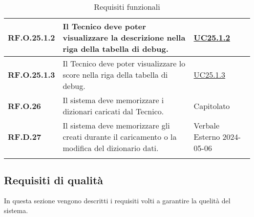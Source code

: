 \begin{longtable}{|P{3cm}|P{6,5cm}|>{\arraybackslash}P{4cm}|}
    \textbf{RF.O.25.1.2} & Il Tecnico deve poter visualizzare la descrizione nella riga della tabella di debug. &  \hyperref[UC25poin1point2]{UC25.1.2}\\
    \hline
    \textbf{RF.O.25.1.3} & Il Tecnico deve poter visualizzare lo score nella riga della tabella di debug. &  \hyperref[UC25poin1point3]{UC25.1.3}\\
    \hline
    \textbf{RF.O.26} & Il sistema deve memorizzare i dizionari caricati dal Tecnico. & Capitolato \\
    \hline
    \textbf{RF.D.27} & Il sistema deve memorizzare gli  creati durante il caricamento o la modifica del dizionario dati. & Verbale Esterno 2024-05-06 \\
    \hline
\caption{Requisiti funzionali}
\label{requisitifunzionali}
\end{longtable}

\subsection{Requisiti di qualità}
In questa sezione vengono descritti i requisiti volti a garantire la quelità del sistema.

